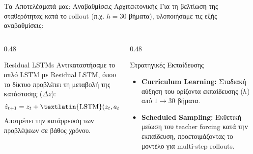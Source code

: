 \documentclass[10pt, aspectratio=169]{beamer}
\begin{document}
\begin{frame}{Τα Αποτελέσματά μας: Αναβαθμίσεις Αρχιτεκτονικής}
    \footnotesize Για τη βελτίωση της σταθερότητας κατά το rollout (π.χ. $h=30$ βήματα), υλοποιήσαμε τις εξής αναβαθμίσεις:\par\vspace{0.2cm}
    \begin{columns}[onlytextwidth, T]
        \begin{column}{0.48\textwidth}
            \begin{block}{Residual LSTMs}
                \scriptsize Αντικαταστήσαμε το απλό \textlatin{LSTM} με \textlatin{Residual LSTM}, όπου το δίκτυο προβλέπει τη μεταβολή της κατάστασης ($\Delta z$):
                \[ \hat{z}_{t+1} = z_t + \text{\textlatin{LSTM}}(z_t, a_t; \theta) \]
                \scriptsize Αποτρέπει την κατάρρευση των προβλέψεων σε βάθος χρόνου.
            \end{block}
        \end{column}
        \begin{column}{0.48\textwidth}
            \begin{block}{Στρατηγικές Εκπαίδευσης}
                \begin{itemize}
                    \item \scriptsize \textbf{Curriculum Learning:} Σταδιακή αύξηση του ορίζοντα εκπαίδευσης ($h$) από $1 \to 30$ βήματα.
                    \item \scriptsize \textbf{Scheduled Sampling:} Εκθετική μείωση του \textlatin{teacher forcing} κατά την εκπαίδευση, προετοιμάζοντας το μοντέλο για \textlatin{multi-step rollouts}.
                \end{itemize}
            \end{block}
        \end{column}
    \end{columns}
\end{frame}
\end{document}

